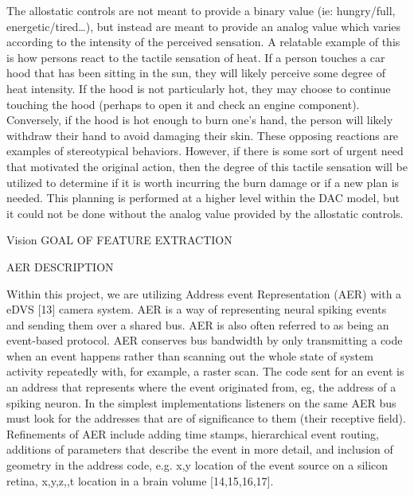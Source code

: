 The allostatic controls are not meant to provide a binary value (ie:
hungry/full, energetic/tired\ldots{}), but instead are meant to provide
an analog value which varies according to the intensity of the perceived
sensation. A relatable example of this is how persons react to the
tactile sensation of heat. If a person touches a car hood that has
been sitting in the sun, they will likely perceive some degree of
heat intensity. If the hood is not particularly hot, they may choose
to continue touching the hood (perhaps to open it and check an engine
component). Conversely, if the hood is hot enough to burn one\textquoteright{}s
hand, the person will likely withdraw their hand to avoid damaging
their skin. These opposing reactions are examples of stereotypical
behaviors. However, if there is some sort of urgent need that motivated
the original action, then the degree of this tactile sensation will
be utilized to determine if it is worth incurring the burn damage
or if a new plan is needed. This planning is performed at a higher
level within the DAC model, but it could not be done without the analog
value provided by the allostatic controls.

Vision GOAL OF FEATURE EXTRACTION

AER DESCRIPTION

Within this project, we are utilizing Address event Representation
(AER) with a eDVS {[}13{]} camera system. AER is a way of representing
neural spiking events and sending them over a shared bus. AER is also
often referred to as being an event-based protocol. AER conserves
bus bandwidth by only transmitting a code when an event happens rather
than scanning out the whole state of system activity repeatedly with,
for example, a raster scan. The code sent for an event is an address
that represents where the event originated from, eg, the address of
a spiking neuron. In the simplest implementations listeners on the
same AER bus must look for the addresses that are of significance
to them (their receptive field). Refinements of AER include adding
time stamps, hierarchical event routing, additions of parameters that
describe the event in more detail, and inclusion of geometry in the
address code, e.g. x,y location of the event source on a silicon retina,
x,y,z,,t location in a brain volume {[}14,15,16,17{]}. 

